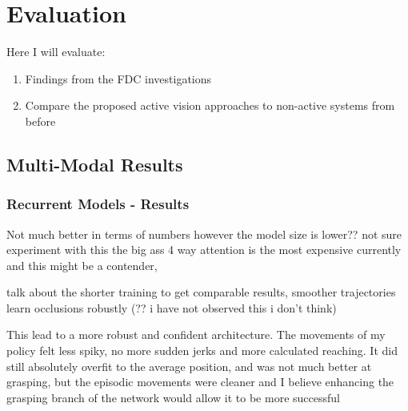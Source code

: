 \chapter{Evaluation}
Here I will evaluate:
\begin{enumerate}
  \item Findings from the FDC investigations
  \item Compare the proposed active vision approaches to non-active systems from before
\end{enumerate}





\section{Multi-Modal Results}

  

  





\subsection{Recurrent Models - Results}
Not much better in terms of numbers however the model size is lower?? not sure experiment with this the big ass 4 way attention is the most expensive currently and this might be a contender,

talk about the shorter training to get comparable results, smoother trajectories learn occlusions robustly (?? i have not observed this i don't think)


This lead to a more robust and confident architecture. The movements of my policy felt less spiky, no more sudden jerks and more calculated reaching. It did still absolutely overfit to the average position, and was not much better at grasping, but the episodic movements were cleaner and I believe enhancing the grasping branch of the network would allow it to be more successful 